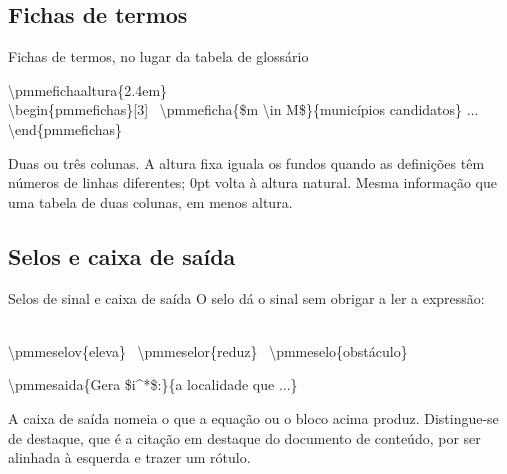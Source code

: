 \documentclass[aspectratio=169,10pt]{beamer}
\newcommand{\cod}[1]{{\ttfamily\fontsize{6.4}{7.6}\selectfont\color{insperCinza}#1}}
\begin{document}
\subsection{Fichas de termos}
\begin{frame}{Fichas de termos, no lugar da tabela de glossário}
  \pmmefichaaltura{2.4em}
  \begin{pmmefichas}[3]
  \end{pmmefichas}
  \pmmefichaaltura{0pt}

  \vspace{0.5em}
  \cod{\textbackslash pmmefichaaltura\{2.4em\}}\\
  \cod{\textbackslash begin\{pmmefichas\}[3] \ \textbackslash pmmeficha\{\$m \textbackslash in M\$\}\{municípios candidatos\} ... \textbackslash end\{pmmefichas\}}

  \vspace{0.7em}
  {\small Duas ou três colunas. A altura fixa iguala os fundos quando as
  definições têm números de linhas diferentes; \num{0pt} volta à altura
  natural. Mesma informação que uma tabela de duas colunas, em menos altura.}
\end{frame}

\subsection{Selos e caixa de saída}
\begin{frame}{Selos de sinal e caixa de saída}
  {\small O selo dá o sinal sem obrigar a ler a expressão:
  \ \ \ \ }

  \vspace{0.4em}
  \cod{\textbackslash pmmeselov\{eleva\} \ \textbackslash pmmeselor\{reduz\} \ \textbackslash pmmeselo\{obstáculo\}}

  \vspace{1.0em}

  \vspace{0.5em}
  \cod{\textbackslash pmmesaida\{Gera \$i\^{}*\$:\}\{a localidade que ...\}}

  \vspace{0.7em}
  {\small A caixa de saída nomeia o que a equação ou o bloco acima produz.
  Distingue-se de \cod{destaque}, que é a citação em destaque do documento de
  conteúdo, por ser alinhada à esquerda e trazer um rótulo.}
\end{frame}
\end{document}
